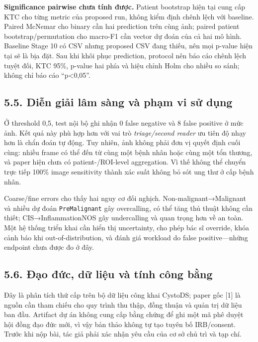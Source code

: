 \documentclass[
  10pt,
  a4paper,
  twocolumn]{article}
\begin{document}
\textbf{Significance pairwise chưa tính được.} Patient bootstrap hiện
tại cung cấp KTC cho từng metric của proposed run, không kiểm định chênh
lệch với baseline. Paired McNemar cho binary cần hai prediction trên
cùng ảnh; paired patient bootstrap/permutation cho macro-F1 cần vector
dự đoán của cả hai mô hình. Baseline Stage 10 có CSV nhưng proposed CSV
đang thiếu, nên mọi p-value hiện tại sẽ là bịa đặt. Sau khi khôi phục
prediction, protocol nên báo cáo chênh lệch tuyệt đối, KTC 95\%, p-value
hai phía và hiệu chỉnh Holm cho nhiều so sánh; không chỉ báo cáo
``p\textless0,05''.

\subsection{5.5. Diễn giải lâm sàng và phạm vi sử
dụng}\label{diux1ec5n-giux1ea3i-luxe2m-suxe0ng-vuxe0-phux1ea1m-vi-sux1eed-dux1ee5ng}

Ở threshold 0,5, test nội bộ ghi nhận 0 false negative và 8 false
positive ở mức ảnh. Kết quả này phù hợp hơn với vai trò
\emph{triage/second reader} ưu tiên độ nhạy hơn là chẩn đoán tự động.
Tuy nhiên, ảnh không phải đơn vị quyết định cuối cùng: nhiều frame có
thể đến từ cùng một bệnh nhân hoặc cùng một tổn thương, và paper hiện
chưa có patient-/ROI-level aggregation. Vì thế không thể chuyển trực
tiếp 100\% image sensitivity thành xác suất không bỏ sót ung thư ở cấp
bệnh nhân.

Coarse/fine errors cho thấy hai nguy cơ đối nghịch.
Non-malignant→\allowbreak{}Malignant và nhiều dự đoán \texttt{PreMalignant} gây
overcalling, có thể tăng thủ thuật không cần thiết; CIS→\allowbreak{}InflammationNOS
gây undercalling và quan trọng hơn về an toàn. Một hệ thống triển khai
cần hiển thị uncertainty, cho phép bác sĩ override, khóa cảnh báo khi
out-of-distribution, và đánh giá workload do false positive---những
endpoint chưa được đo ở đây.

\subsection{5.6. Đạo đức, dữ liệu và tính công
bằng}\label{ux111ux1ea1o-ux111ux1ee9c-dux1eef-liux1ec7u-vuxe0-tuxednh-cuxf4ng-bux1eb1ng}

Đây là phân tích thứ cấp trên bộ dữ liệu công khai CystoDS; paper gốc
{[}1{]} là nguồn cần tham chiếu cho quy trình thu thập, đồng thuận và
quản trị dữ liệu ban đầu. Artifact dự án không cung cấp bằng chứng để
ghi một mã phê duyệt hội đồng đạo đức mới, vì vậy bản thảo không tự tạo
tuyên bố IRB/consent. Trước khi nộp bài, tác giả phải xác nhận yêu cầu
của cơ sở chủ trì và tạp chí.
\end{document}
